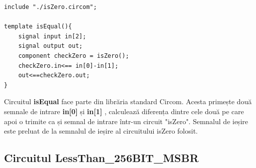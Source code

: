 \documentclass[12pt, letterpaper]{article}
\begin{document}
\begin{lstlisting}[caption="isEqual.circom"]
include "./isZero.circom";

template isEqual(){
    signal input in[2];
    signal output out;
    component checkZero = isZero();
    checkZero.in<== in[0]-in[1];
    out<==checkZero.out;
}
\end{lstlisting}
Circuitul \textbf{isEqual} face parte din librăria standard Circom. Acesta primește două semnale de intrare \textbf{in[0]} și \textbf{in[1]} , calculează diferența dintre cele două pe care apoi o trimite ca și semnal de intrare  într-un circuit "isZero". Semnalul de ieșire este preluat de la semnalul de ieșire al circuitului isZero folosit.

\pagebreak
\subsection{Circuitul LessThan\_256BIT\_MSBR}
\end{document}

